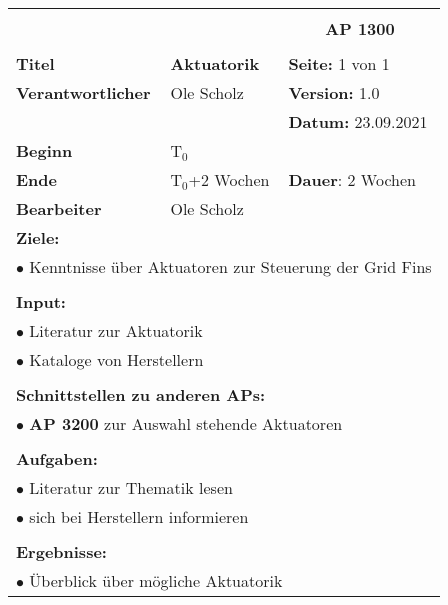 \clearpage
\begin{table}[!h]
	\begin{center}
		\begin{tabular}{|p{35mm}||p{55mm}|p{50mm}||p{40mm}|}
			\hline
			\multicolumn{3}{|l||}{\textbf{}} & \multicolumn{1}{c|}{}\\
			\multicolumn{3}{|l||}{\textbf{}} & \multicolumn{1}{c|}{\textbf{AP 1300}}\\
			\multicolumn{3}{|l||}{\textbf{}} & \multicolumn{1}{c|}{}\\
			\hline\hline
			\textbf{Titel} & \multicolumn{2}{p{7cm}||}{\textbf{Aktuatorik}} 
			& \textbf{Seite:} 1 von 1\\
			\hline
			\textbf{Verantwortlicher} & \multicolumn{2}{l||}{Ole Scholz} & \textbf{Version:} 1.0\\
			\hline
			\multicolumn{3}{|l||}{} & \textbf{Datum:} 23.09.2021\\
			\hline\hline
			\textbf{Beginn} & \multicolumn{2}{l||}{T$_0$} & \\
			\hline
			\textbf{Ende} & \multicolumn{2}{l||}{T$_0$+2 Wochen} & \textbf{Dauer}: 2 Wochen\\
			\hline\hline
			\textbf{Bearbeiter} & \multicolumn{3}{l|}{Ole Scholz}\\
			\hline\hline
			\multicolumn{4}{|p{150mm}|}{\textbf{Ziele:}}\\
			\multicolumn{4}{|p{150mm}|}{$\bullet$ Kenntnisse über Aktuatoren zur Steuerung der Grid Fins}\\
			\multicolumn{4}{|p{150mm}|}{}\\
			\multicolumn{4}{|p{150mm}|}{\textbf{Input:}}\\
			\multicolumn{4}{|p{150mm}|}{$\bullet$ Literatur zur Aktuatorik}\\
			\multicolumn{4}{|p{150mm}|}{$\bullet$ Kataloge von Herstellern}\\
			\multicolumn{4}{|p{150mm}|}{}\\
			\multicolumn{4}{|p{150mm}|}{\textbf{Schnittstellen zu anderen APs:}}\\
			\multicolumn{4}{|p{150mm}|}{$\bullet$ \textbf{AP 3200} zur Auswahl stehende Aktuatoren}\\
			\multicolumn{4}{|p{150mm}|}{}\\
			\multicolumn{4}{|p{150mm}|}{\textbf{Aufgaben:}}\\
			\multicolumn{4}{|p{150mm}|}{$\bullet$ Literatur zur Thematik lesen}\\
			\multicolumn{4}{|p{150mm}|}{$\bullet$ sich bei Herstellern informieren}\\
			\multicolumn{4}{|p{150mm}|}{}\\
			\multicolumn{4}{|p{150mm}|}{\textbf{Ergebnisse:}}\\
			\multicolumn{4}{|p{150mm}|}{$\bullet$ Überblick über mögliche Aktuatorik}\\
			\hline
		\end{tabular}
	\end{center}
\end{table}

